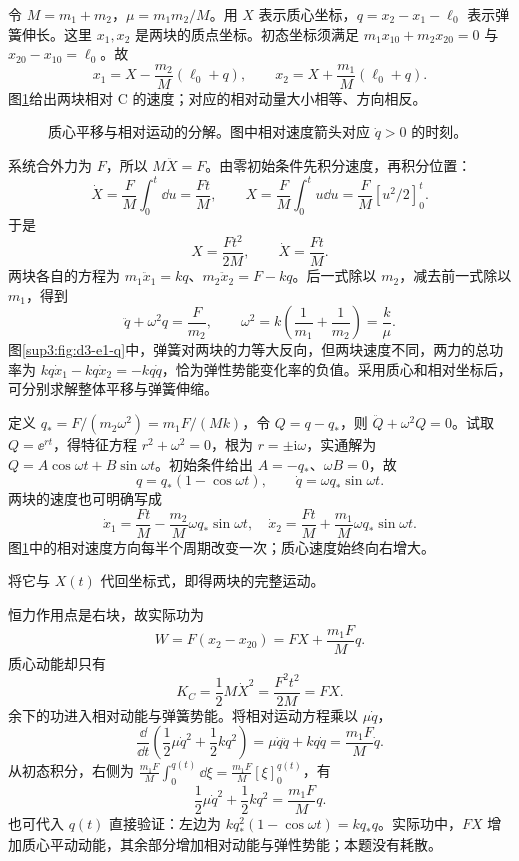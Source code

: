 \begin{solution}
令 $M=m_1+m_2$，$\mu=m_1m_2/M$。用 $X$ 表示质心坐标，$q=x_2-x_1-\ell_0$ 表示弹簧伸长。这里 $x_1,x_2$ 是两块的质点坐标。初态坐标须满足
$m_1x_{10}+m_2x_{20}=0$ 与 $x_{20}-x_{10}=\ell_0$。故
\[
x_1=X-\frac{m_2}{M}(\ell_0+q),\qquad
x_2=X+\frac{m_1}{M}(\ell_0+q).
\]
图\ref{sup3:fig:d3-e1-s}给出两块相对 C 的速度；对应的相对动量大小相等、方向相反。
\begin{figure}[H]\centering
{}
\caption{质心平移与相对运动的分解。图中相对速度箭头对应 $\dot q>0$ 的时刻。}\label{sup3:fig:d3-e1-s}
\end{figure}
系统合外力为 $F$，所以 $M\ddot X=F$。由零初始条件先积分速度，再积分位置：
\[
\dot X=\frac FM\int_0^t\dd u=\frac{Ft}M,
\qquad X=\frac FM\int_0^tu\dd u=\frac FM[u^2/2]_0^t.
\]
于是
\[
X=\frac{Ft^2}{2M},\qquad \dot X=\frac{Ft}{M}.
\]
两块各自的方程为 $m_1\ddot x_1=kq$、$m_2\ddot x_2=F-kq$。后一式除以 $m_2$，减去前一式除以 $m_1$，得到
\[
\ddot q+\omega^2q=\frac F{m_2},\qquad
\omega^2=k\left(\frac1{m_1}+\frac1{m_2}\right)=\frac k\mu.
\]
图\ref{sup3:fig:d3-e1-q}中，弹簧对两块的力等大反向，但两块速度不同，两力的总功率为 $kq\dot x_1-kq\dot x_2=-kq\dot q$，恰为弹性势能变化率的负值。采用质心和相对坐标后，可分别求解整体平移与弹簧伸缩。

定义 $q_*=F/(m_2\omega^2)=m_1F/(Mk)$，令 $Q=q-q_*$，则 $\ddot Q+\omega^2Q=0$。试取 $Q=\ee^{rt}$，得特征方程 $r^2+\omega^2=0$，根为 $r=\pm\mathrm i\omega$，实通解为 $Q=A\cos\omega t+B\sin\omega t$。初始条件给出 $A=-q_*$、$\omega B=0$，故
\[
q=q_*(1-\cos\omega t),\qquad \dot q=\omega q_*\sin\omega t.
\]
两块的速度也可明确写成
\[
\dot x_1=\frac{Ft}{M}-\frac{m_2}{M}\omega q_*\sin\omega t,
\quad
\dot x_2=\frac{Ft}{M}+\frac{m_1}{M}\omega q_*\sin\omega t.
\]
图\ref{sup3:fig:d3-e1-s}中的相对速度方向每半个周期改变一次；质心速度始终向右增大。

将它与 $X(t)$ 代回坐标式，即得两块的完整运动。

恒力作用点是右块，故实际功为
\[
W=F(x_2-x_{20})=FX+\frac{m_1F}{M}q.
\]
质心动能却只有
\[
K_C=\frac12M\dot X^2=\frac{F^2t^2}{2M}=FX.
\]
余下的功进入相对动能与弹簧势能。将相对运动方程乘以 $\mu\dot q$，
\[
\frac{\dd}{\dd t}\left(\frac12\mu\dot q^2+\frac12kq^2\right)
=\mu\dot q\ddot q+kq\dot q=\frac{m_1F}{M}\dot q.
\]
从初态积分，右侧为 $\frac{m_1F}{M}\int_0^{q(t)}\dd\xi=\frac{m_1F}{M}[\xi]_0^{q(t)}$，有
\[
\frac12\mu\dot q^2+\frac12kq^2=\frac{m_1F}{M}q.
\]
也可代入 $q(t)$ 直接验证：左边为 $kq_*^2(1-\cos\omega t)=kq_*q$。实际功中，$FX$ 增加质心平动动能，其余部分增加相对动能与弹性势能；本题没有耗散。
\end{solution}



